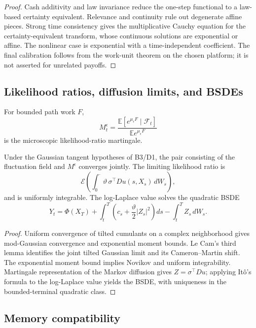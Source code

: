 \begin{proof}
Cash additivity and law invariance reduce the one-step functional to a
law-based certainty equivalent.  Relevance and continuity rule out
degenerate affine pieces.  Strong time consistency gives the multiplicative
Cauchy equation for the certainty-equivalent transform, whose continuous
solutions are exponential or affine.  The nonlinear case is exponential
with a time-independent coefficient.  The final calibration follows from
the work-unit theorem on the chosen platform; it is not asserted for
unrelated payoffs.
\end{proof}

\subsection{Likelihood ratios, diffusion limits, and BSDEs}

For bounded path work \(F\),
\[
 M_t^\epsilon=
 \frac{\mathbb E[e^{\mu_\epsilon F}\mid\mathcal F_t]}
      {\mathbb E e^{\mu_\epsilon F}}
\]
is the microscopic likelihood-ratio martingale.

\begin{theorem}
\label{thm:rr2-c2-likelihood}
Under the Gaussian tangent hypotheses of B3/D1, the pair consisting of the
fluctuation field and \(M^\epsilon\) converges jointly.  The limiting
likelihood ratio is
\[
 \mathcal E\!\left(
 \int_0^\cdot \vartheta\,\sigma^\top Du(s,X_s)\,dW_s
 \right),
\]
and is uniformly integrable.  The log-Laplace value solves the quadratic
BSDE
\[
 Y_t=\Phi(X_T)+\int_t^T
 \left(c_s+\frac{\vartheta}{2}|Z_s|^2\right)ds
 -\int_t^TZ_s\,dW_s .
\]
\end{theorem}

\begin{proof}
Uniform convergence of tilted cumulants on a complex neighborhood gives
mod-Gaussian convergence and exponential moment bounds.  Le Cam's third
lemma identifies the joint tilted Gaussian limit and its Cameron--Martin
shift.  The exponential moment bound implies Novikov and uniform
integrability.  Martingale representation of the Markov diffusion gives
\(Z=\sigma^\top Du\); applying It\^o's formula to the log-Laplace value
yields the BSDE, with uniqueness in the bounded-terminal quadratic class.
\end{proof}

\subsection{Memory compatibility}

